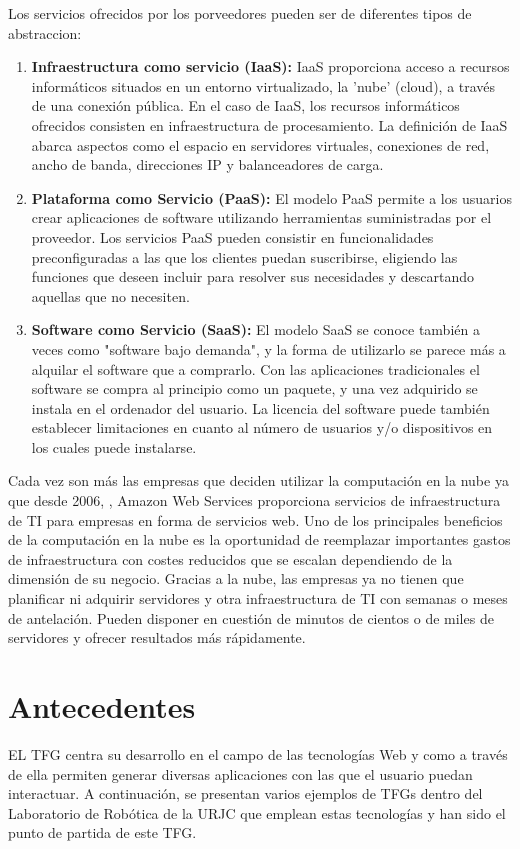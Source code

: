 Los servicios ofrecidos por los porveedores pueden ser de diferentes tipos de abstraccion:

\begin{enumerate}
     \item \textbf{Infraestructura como servicio (IaaS): } IaaS proporciona acceso a recursos informáticos situados en un entorno virtualizado, la 'nube' (cloud), a través de una conexión pública. En el caso de IaaS, los recursos informáticos ofrecidos consisten en infraestructura de procesamiento. La definición de IaaS abarca aspectos como el espacio en servidores virtuales, conexiones de red, ancho de banda, direcciones IP y balanceadores de carga.
    \item \textbf{Plataforma como Servicio (PaaS): }El modelo PaaS permite a los usuarios crear aplicaciones de software utilizando herramientas suministradas por el proveedor. Los servicios PaaS pueden consistir en funcionalidades preconfiguradas a las que los clientes puedan suscribirse, eligiendo las funciones que deseen incluir para resolver sus necesidades y descartando aquellas que no necesiten.
    \item \textbf{Software como Servicio (SaaS): } El modelo SaaS se conoce también a veces como "software bajo demanda", y la forma de utilizarlo se parece más a alquilar el software que a comprarlo. Con las aplicaciones tradicionales el software se compra al principio como un paquete, y una vez adquirido se instala en el ordenador del usuario. La licencia del software puede también establecer limitaciones en cuanto al número de usuarios y/o dispositivos en los cuales puede instalarse.

\end{enumerate}

Cada vez son más las empresas que deciden utilizar la computación en la nube ya que desde 2006, , Amazon Web Services proporciona servicios de infraestructura de TI para empresas en forma de servicios web.
Uno de los principales beneficios de la computación en la nube es la oportunidad de reemplazar importantes gastos de infraestructura con costes reducidos que se escalan dependiendo de la dimensión de su negocio.
Gracias a la nube, las empresas ya no tienen que planificar ni adquirir servidores y otra infraestructura de TI con semanas o meses de antelación. Pueden disponer en cuestión de minutos de cientos o de miles de servidores y ofrecer resultados más rápidamente.

\section{Antecedentes}
EL TFG centra su desarrollo en el campo de las tecnologías Web y como a través de ella permiten generar diversas aplicaciones con las que el usuario puedan interactuar. A continuación, se presentan varios ejemplos de TFGs dentro del Laboratorio de Robótica de la URJC que emplean estas tecnologías y han sido el punto de partida de este TFG.

